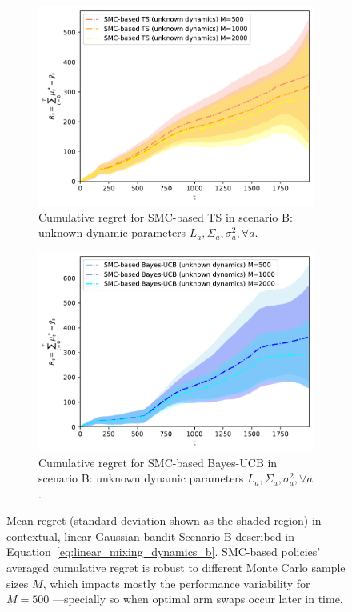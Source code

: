 \begin{figure}[!h]
	\begin{subfigure}[b]{0.45\textwidth}
		\includegraphics[width=\textwidth]{./fods_figs/dynamic/linearGaussian/b_selectedM_cumulative_regret_dunknown_ts}
		\caption{Cumulative regret for SMC-based TS in scenario B: unknown dynamic parameters $L_a,\Sigma_a,\sigma_a^2, \forall a$.}
		\label{fig:dynamic_bandits_linearGaussian_b_ts_dunknown_M}
	\end{subfigure}\qquad
	\begin{subfigure}[b]{0.45\textwidth}
		\includegraphics[width=\textwidth]{./fods_figs/dynamic/linearGaussian/b_selectedM_cumulative_regret_dunknown_bucb}
		\caption{Cumulative regret for SMC-based Bayes-UCB in scenario B: unknown dynamic parameters $L_a,\Sigma_a,\sigma_a^2, \forall a$.}
		\label{fig:dynamic_bandits_linearGaussian_b_bucb_dunknown_M}
	\end{subfigure}
	
	\caption{
		Mean regret (standard deviation shown as the shaded region) in contextual, linear Gaussian bandit Scenario B
		described in Equation~\eqref{eq:linear_mixing_dynamics_b}.
		SMC-based policies' averaged cumulative regret is robust to different Monte Carlo sample sizes $M$,
		which impacts mostly the performance variability for $M=500$ ---specially so when optimal arm swaps occur later in time.
	}
	\label{fig:dynamic_bandits_linearGaussian_b_M}
\end{figure}